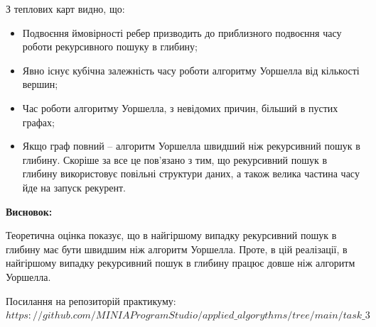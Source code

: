 \documentclass{article}
\begin{document}
З теплових карт видно, що:
\begin{itemize}
	\item Подвоєння ймовірності ребер призводить до приблизного подвоєння часу роботи рекурсивного пошуку в глибину;
	\item Явно існує кубічна залежність часу роботи алгоритму Уоршелла від кількості вершин;
	\item Час роботи алгоритму Уоршелла, з невідомих причин, більший в пустих графах;
	\item Якщо граф повний -- алгоритм Уоршелла швидший ніж рекурсивний пошук в глибину. Скоріше за все це пов'язано з тим, що рекурсивний пошук в глибину використовує повільні структури даних, а також велика частина часу йде на запуск рекурент.\\\indent
\end{itemize}

\textbf{Висновок:}\\\indent

Теоретична оцінка показує, що в найгіршому випадку рекурсивний пошук в глибину має бути швидшим ніж алгоритм Уоршелла. Проте, в цій реалізації, в найгіршому випадку рекурсивний пошук в глибину працює довше ніж алгоритм Уоршелла.

Посилання на репозиторій практикуму:\\ \href{$https://github.com/MINIAProgramStudio/applied_algorythms/tree/main/task_3$}{$https://github.com/MINIAProgramStudio/applied\_algorythms/tree/main/task\_3$}
\end{document}
